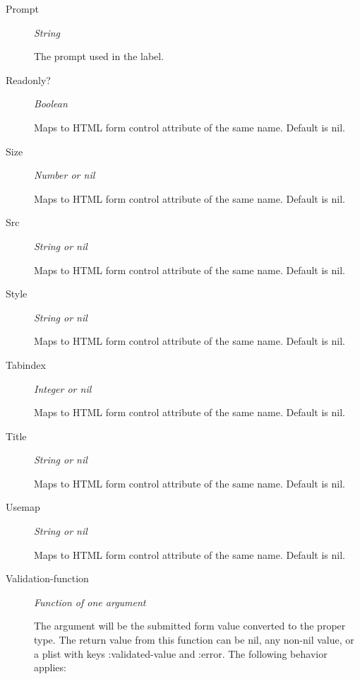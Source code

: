 \documentclass [11pt]{book}
\begin{document}
\begin{itemize}
\begin{description}
\item [Prompt]
\emph{String}

 The prompt used in the label.




\item [Readonly?]
\emph{Boolean}

 Maps to HTML form control attribute of the same name. Default is nil.




\item [Size]
\emph{Number or nil}

 Maps to HTML form control attribute of the same name. Default is nil.




\item [Src]
\emph{String or nil}

 Maps to HTML form control attribute of the same name. Default is nil.




\item [Style]
\emph{String or nil}

 Maps to HTML form control attribute of the same name. Default is nil.




\item [Tabindex]
\emph{Integer or nil}

 Maps to HTML form control attribute of the same name. Default is nil.




\item [Title]
\emph{String or nil}

 Maps to HTML form control attribute of the same name. Default is nil.




\item [Usemap]
\emph{String or nil}

 Maps to HTML form control attribute of the same name. Default is nil.




\item [Validation-function]
\emph{Function of one argument}

 The argument will be the submitted form value converted to the proper type.
The return value from this function can be nil, any non-nil value, or a plist with keys :validated-value
and :error. The following behavior applies:



\end{description}
\end{itemize}
\end{document}
